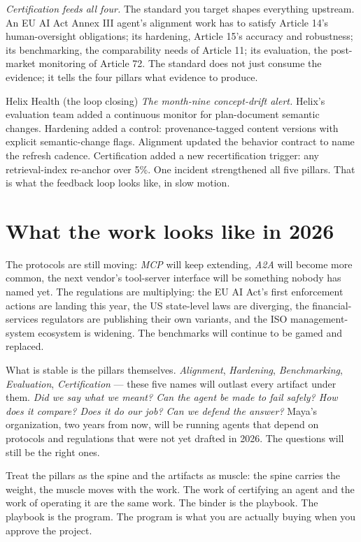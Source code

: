 \textit{Certification feeds all four.} The standard you target shapes everything upstream. An EU AI Act Annex III agent's alignment work has to satisfy Article 14's human-oversight obligations; its hardening, Article 15's accuracy and robustness; its benchmarking, the comparability needs of Article 11; its evaluation, the post-market monitoring of Article 72. The standard does not just consume the evidence; it tells the four pillars what evidence to produce.

\begin{TNinpractice}{Helix Health (the loop closing)}
\textit{The month-nine concept-drift alert.} Helix's evaluation team added a continuous monitor for plan-document semantic changes. Hardening added a control: provenance-tagged content versions with explicit semantic-change flags. Alignment updated the behavior contract to name the refresh cadence. Certification added a new recertification trigger: any retrieval-index re-anchor over 5\%. One incident strengthened all five pillars. That is what the feedback loop looks like, in slow motion.
\end{TNinpractice}

\section{What the work looks like in 2026}

The protocols are still moving: \textit{MCP} will keep extending, \textit{A2A} will become more common, the next vendor's tool-server interface will be something nobody has named yet. The regulations are multiplying: the EU AI Act's first enforcement actions are landing this year, the US state-level laws are diverging, the financial-services regulators are publishing their own variants, and the ISO management-system ecosystem is widening. The benchmarks will continue to be gamed and replaced.

What is stable is the pillars themselves. \textit{Alignment}, \textit{Hardening}, \textit{Benchmarking}, \textit{Evaluation}, \textit{Certification} --- these five names will outlast every artifact under them. \textit{Did we say what we meant? Can the agent be made to fail safely? How does it compare? Does it do our job? Can we defend the answer?} Maya's organization, two years from now, will be running agents that depend on protocols and regulations that were not yet drafted in 2026. The questions will still be the right ones.

Treat the pillars as the spine and the artifacts as muscle: the spine carries the weight, the muscle moves with the work. The work of certifying an agent and the work of operating it are the same work. The binder is the playbook. The playbook is the program. The program is what you are actually buying when you approve the project.

